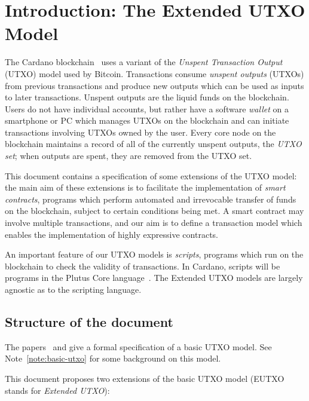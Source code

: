 \documentclass[a4paper]{article}
\newcounter{note}
\begin{document}
\maketitle

\section{Introduction: The Extended UTXO Model}
\label{sec:intro}
The Cardano blockchain~\citep{Cardano, Cardano-ledger-spec} uses a
variant of the \textit{Unspent Transaction Output} (UTXO) model used
by Bitcoin.  Transactions consume \textit{unspent outputs} (UTXOs)
from previous transactions and produce new outputs which can be used
as inputs to later transactions.  Unspent outputs are the liquid funds
on the blockchain. Users do not have individual accounts, but rather
have a software \textit{wallet} on a smartphone or PC which manages
UTXOs on the blockchain and can initiate transactions involving UTXOs
owned by the user.  Every core node on the blockchain maintains a
record of all of the currently unspent outputs, the \textit{UTXO set};
when outputs are spent, they are removed from the UTXO set.

This document contains a specification of some extensions of the
UTXO model: the main aim of these extensions is to facilitate the
implementation of \textit{smart contracts}, programs which perform
automated and irrevocable transfer of funds on the blockchain, subject
to certain conditions being met.  A smart contract may involve
multiple transactions, and our aim is to define a transaction model
which enables the implementation of highly expressive contracts.

An important feature of our UTXO models is \textit{scripts},
programs which run on the blockchain to check the validity of
transactions.  In Cardano, scripts will be programs in the Plutus Core
language~\citep{Plutus-Core-spec}. The Extended UTXO models are largely
agnostic as to the scripting language.


\subsection{Structure of the document}
\label{sec:doc-structure}
The papers~\citep{Zahnentferner18-Chimeric} and
\citep{Zahnentferner18-UTxO} give a formal specification of a basic
UTXO model. See Note~\ref{note:basic-utxo} for some background on
this model.

\medskip
\noindent This document proposes two extensions of the basic UTXO
model (EUTXO stands for \textit{Extended UTXO}):
\end{document}
